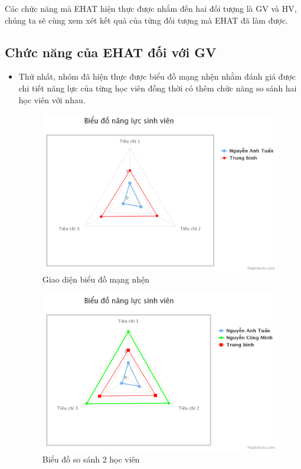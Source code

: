 Các chức năng mà EHAT hiện thực được nhắm đến hai đối tượng là GV và HV, chúng ta sẽ cùng xem xét kết quả của từng đối tượng mà EHAT đã làm được.

\vskip 5cm
\subsection{Chức năng của EHAT đối với GV}

\begin{itemize}
	\item Thứ nhất, nhóm đã hiện thực được biểu đồ mạng nhện nhằm đánh giá được chi tiết năng lực của từng học viên đồng thời có thêm chức năng so sánh hai học viên với nhau.
	
	\begin{center}
		\begin{figure}[htp]
			\begin{center}
				\includegraphics[width=0.8\linewidth]{img/22}
			\end{center}
			\caption{Giao diện biểu đồ mạng nhện}
			\label{refhinh70}
		\end{figure}
	\end{center}

	\begin{center}
		\begin{figure}[htp]
			\begin{center}
				\includegraphics[width=0.8\linewidth]{img/25}
			\end{center}
			\caption{Biểu đồ so sánh 2 học viên}
			\label{refhinh71}
		\end{figure}
	\end{center}
	

\end{itemize}
